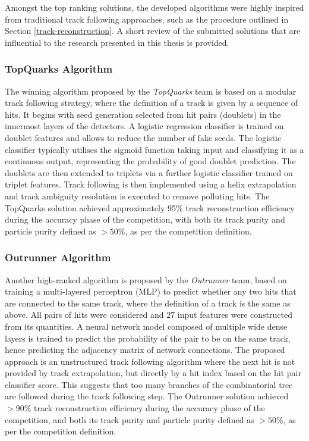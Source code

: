 Amongst the top ranking solutions, the developed algorithms were highly inspired from traditional track following approaches, such as the procedure outlined in Section \ref{track-reconstruction}. A short review of the submitted solutions that are influential to the research presented in this thesis is provided.

\subsubsection{TopQuarks Algorithm}

The winning algorithm proposed by the \textit{TopQuarks} team is based on a modular track following strategy, where the definition of a track is given by a sequence of hits. It begins with seed generation selected from hit pairs (doublets) in the innermost layers of the detectors. A logistic regression classifier is trained on doublet features and allows to reduce the number of fake seeds. The logistic classifier typically utilises the sigmoid function taking input and classifying it as a continuous output, representing the probability of good doublet prediction. The doublets are then extended to triplets via a further logistic classifier trained on triplet features. Track following is then implemented using a helix extrapolation and track ambiguity resolution is executed to remove polluting hits. The TopQuarks solution achieved approximately 95\% track reconstruction efficiency during the accuracy phase of the competition, with both its track purity and particle purity defined as $> 50\%$, as per the competition definition.


\subsubsection{Outrunner Algorithm}

Another high-ranked algorithm is proposed by the \textit{Outrunner} team, based on training a multi-layered perceptron (MLP) to predict whether any two hits that are connected to the same track, where the definition of a track is the same as above. All pairs of hits were considered and 27 input features were constructed from its quantities. A neural network model composed of multiple wide dense layers is trained to predict the probability of the pair to be on the same track, hence predicting the adjacency matrix of network connections. The proposed approach is an unstructured track following algorithm where the next hit is not provided by track extrapolation, but directly by a hit index based on the hit pair classifier score. This suggests that too many branches of the combinatorial tree are followed during the track following step. The Outrunner solution achieved $> 90\%$ track reconstruction efficiency during the accuracy phase of the competition, and both its track purity and particle purity defined as $> 50\%$, as per the competition definition.

